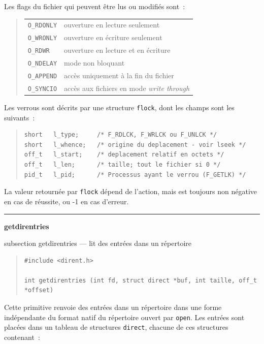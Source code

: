 \documentclass [twoside] {report}
\newcommand {\primitive} [1]
    {
	\phantomsection
	{\large \textbf {#1}}
	\addcontentsline {toc} {subsection} {#1}
    }
\newcommand {\separation}
    {
	\vspace {5mm}
	\nopagebreak
	\hrule
    }
\begin{document}
Les flags du fichier qui peuvent être lus ou modifiés sont~:

{\small
\begin {quote}
    \begin {tabular} {|ll|} \hline
	\texttt {O\_RDONLY} & ouverture en lecture seulement \\
	\texttt {O\_WRONLY} & ouverture en écriture seulement \\
	\texttt {O\_RDWR} & ouverture en lecture et en écriture \\
	\texttt {O\_NDELAY} & mode non bloquant \\
	\texttt {O\_APPEND} & accès uniquement à la fin du fichier \\
	\texttt {O\_SYNCIO} & accès aux fichiers en mode \emph {write through}
	    \\ \hline
    \end {tabular}
\end {quote}
}

Les verrous sont décrits par une structure \texttt {flock}, dont les champs
sont les suivants~:

\begin {quote}
\begin {verbatim}
short   l_type;     /* F_RDLCK, F_WRLCK ou F_UNLCK */
short   l_whence;   /* origine du deplacement - voir lseek */
off_t   l_start;    /* deplacement relatif en octets */
off_t   l_len;      /* taille; tout le fichier si 0 */
pid_t   l_pid;      /* Processus ayant le verrou (F_GETLK) */
\end{verbatim}
\end {quote}

La valeur retournée par \texttt {flock} dépend de l'action, mais est
toujours non négative en cas de réussite, ou
-1 en cas d'erreur.




\separation
\primitive {getdirentries} --- lit des entrées dans un répertoire

\begin {quote}
\begin {verbatim}
#include <dirent.h>

int getdirentries (int fd, struct direct *buf, int taille, off_t *offset)
\end{verbatim}
\end {quote}

Cette primitive renvoie des entrées dans un répertoire dans une
forme indépendante du format natif du répertoire ouvert par \texttt {open}.
Les entrées sont placées dans un tableau de structures \texttt {direct},
chacune de ces structures contenant~:
\end{document}
